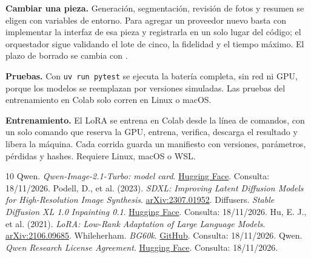 \documentclass[11pt,a4paper]{article}
\newcommand{\ruta}[1]{{\small\texttt{\detokenize{#1}}}}
\begin{document}
\textbf{Cambiar una pieza.} Generación, segmentación, revisión de fotos y resumen se eligen con variables de entorno. Para agregar un proveedor nuevo basta con implementar la interfaz de esa pieza y registrarla en un solo lugar del código; el orquestador sigue validando el lote de cinco, la fidelidad y el tiempo máximo. El plazo de borrado se cambia con \ruta{SESSION_RETENTION_HOURS}.

\textbf{Pruebas.} Con \texttt{uv run pytest} se ejecuta la batería completa, sin red ni GPU, porque los modelos se reemplazan por versiones simuladas. Las pruebas del entrenamiento en Colab solo corren en Linux o macOS.

\textbf{Entrenamiento.} El LoRA se entrena en Colab desde la línea de comandos, con un solo comando que reserva la GPU, entrena, verifica, descarga el resultado y libera la máquina. Cada corrida guarda un manifiesto con versiones, parámetros, pérdidas y hashes. Requiere Linux, macOS o WSL.

\begingroup\small
\renewcommand{\refname}{Referencias}
\begin{thebibliography}{10}
\setlength{\itemsep}{3pt}\setlength{\parskip}{0pt}
 Qwen. \emph{Qwen-Image-2.1-Turbo: model card}. \href{https://huggingface.co/Qwen/Qwen-Image-2.1-Turbo}{Hugging Face}. Consulta: 18/11/2026.
 Podell, D., et al. (2023). \emph{SDXL: Improving Latent Diffusion Models for High-Resolution Image Synthesis}. \href{https://arxiv.org/abs/2307.01952}{arXiv:2307.01952}.
 Diffusers. \emph{Stable Diffusion XL 1.0 Inpainting 0.1}. \href{https://huggingface.co/diffusers/stable-diffusion-xl-1.0-inpainting-0.1}{Hugging Face}. Consulta: 18/11/2026.
 Hu, E. J., et al. (2021). \emph{LoRA: Low-Rank Adaptation of Large Language Models}. \href{https://arxiv.org/abs/2106.09685}{arXiv:2106.09685}.
 Whileherham. \emph{BG60k}. \href{https://github.com/Whileherham/BG60k}{GitHub}. Consulta: 18/11/2026.
 Qwen. \emph{Qwen Research License Agreement}. \href{https://huggingface.co/Qwen/Qwen-Image-2.1-Turbo/blob/fc13ba1986fcb905854dc8de2f52eee395f49b5b/LICENSE}{Hugging Face}. Consulta: 18/11/2026.
\end{thebibliography}
\endgroup
\end{document}
